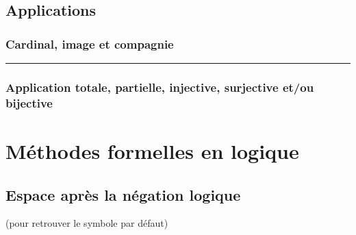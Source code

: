 \documentclass[12pt,a4paper]{book}
\theoremstyle{definition}
\newcommand\separation{
	\medskip
	\hfill\rule{0.5\textwidth}{0.75pt}\hfill
	\medskip
}
\begin{document}
{{



\subsection{Applications}

\subsubsection{Cardinal, image et compagnie}






\separation






\subsubsection{Application totale, partielle, injective, surjective et/ou bijective}



\vspace{-.75em}
\begin{multicols}{2}
    
    
    
    
    
    
    
\end{multicols}


\section{Méthodes formelles en logique}

\subsection{Espace après la négation logique}




 (pour retrouver le symbole par défaut)


}}
\end{document}

